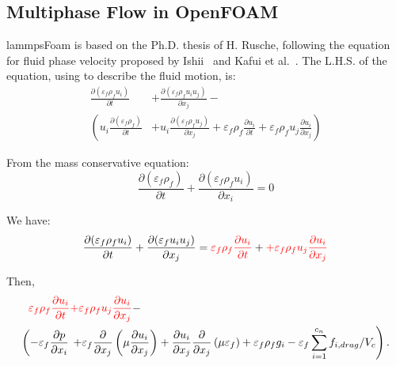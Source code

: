 \documentclass[11pt]{article}
\begin{document}
\subsection{Multiphase Flow in OpenFOAM}
lammpsFoam is based on the Ph.D. thesis of H. Rusche, following the equation for fluid phase
velocity proposed by Ishii~\cite{ishii75tf} and Kafui et al.~\cite{kafui02dp}. The L.H.S. of the
equation, using to describe the fluid motion, is:
\begin{equation}
    \begin{split}
      \frac{\partial (\varepsilon_f \rho_f u_i)}{\partial t}
    &+\frac{\partial (\varepsilon_f \rho_f u_i u_j)}{\partial x_j} - \\
       \left(u_i \frac{\partial (\varepsilon_f \rho_f)}{\partial t}\right.
    &\left.+ u_i \frac{\partial (\varepsilon_f \rho_f u_j)}{\partial x_j} 
     + \varepsilon_f \rho_f \frac{\partial u_i}{\partial t}
     + \varepsilon_f \rho_f u_j \frac{\partial u_i}{\partial x_j}\right)
    \end{split}
\label{eqn:NS-DEM-Rusche-1}
\end{equation}

From the mass conservative equation:
\begin{equation}
    \frac{\partial (\varepsilon_f \rho_f)}{\partial t}
  + \frac{\partial (\varepsilon_f \rho_f u_i)}{\partial x_i} = 0
\label{eqn:NS-DEM-mass}
\end{equation}

We have:
\begin{equation}
    \begin{split}
      \frac{\partial (\varepsilon_f \rho_f u_i)}{\partial t}
    + \frac{\partial (\varepsilon_f u_i u_j)}{\partial x_j} =
      {\color{red}\varepsilon_f \rho_f \frac{\partial u_i}{\partial t}}
    + {\color{red}+\varepsilon_f \rho_f u_j \frac{\partial u_i}{\partial x_j}}
    \end{split}
\label{eqn:NS-DEM-Rusche-eq}
\end{equation}

Then,
\begin{equation}
    \begin{split}
    {\color{red}\varepsilon_f \rho_f \frac{\partial u_i}{\partial t}}
    &{\color{red}+\varepsilon_f \rho_f u_j \frac{\partial u_i}{\partial x_j}} - \\
     \left(- \varepsilon_f \frac{\partial p}{\partial x_i}\right.
    &\left.+ \varepsilon_f \frac{\partial}{\partial x_j}
     \left(\mu \frac{\partial u_i}{\partial x_j}\right)
     + \frac{\partial u_i}{\partial x_j}\frac{\partial}{\partial x_j}\left(\mu \varepsilon_f \right)
     + \varepsilon_f \rho_f g_i
     - \varepsilon_f \sum\limits_{i=1}^{c_n}f_{i,drag}/V_c\right) .
    \end{split}
\label{eqn:NS-DEM-Rusche-2}
\end{equation}
\end{document}
